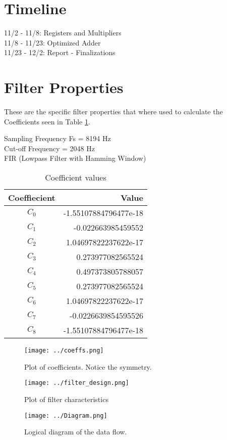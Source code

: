 \documentclass[12pt]{article}
\begin{document}
\section{Timeline}

11/2 - 11/8: Registers and Multipliers \\
11/8 - 11/23: Optimized Adder \\
11/23 - 12/2: Report - Finalizations \\

\section{Filter Properties}
These are the specific filter properties that where used to calculate the Coefficients seen in Table \ref{tab:coefficients}.

Sampling Frequency Fs = 8194 Hz \\
Cut-off Frequency = 2048 Hz \\
FIR (Lowpass Filter with Hamming Window) \\

\begin{table}[ht]
\centering
\begin{tabular}{ c | r }
\hline
Coeffiecient & Value \\
\hline \hline
$C_0$ & -1.55107884796477e-18 \\
$C_1$ & -0.022663985459552 \\
$C_2$ & 1.04697822237622e-17 \\
$C_3$ & 0.273977082565524 \\
$C_4$ & 0.497373805788057 \\
$C_5$ & 0.273977082565524 \\
$C_6$ & 1.04697822237622e-17 \\
$C_7$ & -0.0226639854595526 \\
$C_8$ & -1.55107884796477e-18 \\
\end{tabular}
\caption{Coefficient values}
\label{tab:coefficients}
\end{table}


\begin{figure}[ht]
\centering
\texttt{[image: ../coeffs.png]}
\caption{Plot of coefficients.  Notice the symmetry.}
\label{fig:plotcoefficients}
\end{figure}

\begin{figure}[ht]
\centering
\texttt{[image: ../filter\_design.png]}
\caption{Plot of filter characteristics}
\label{fig:characteristics}
\end{figure}

\begin{figure}[ht]
\centering
\texttt{[image: ../Diagram.png]}
\caption{Logical diagram of the data flow.}
\label{fig:diagram}
\end{figure}

\fi
\end{document}
